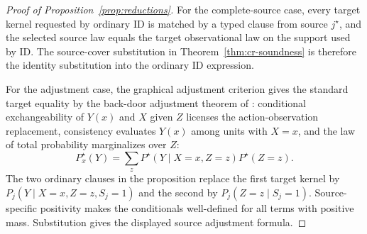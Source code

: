 \documentclass[11pt]{article}
\theoremstyle{definition}
\theoremstyle{plain}
\theoremstyle{remark}
\begin{document}
\begin{proof}[Proof of Proposition~\ref{prop:reductions}]
For the complete-source case, every target kernel requested by ordinary ID is
matched by a typed clause from source \(j^\star\), and the selected source law
equals the target observational law on the support used by ID.  The
source-cover substitution in Theorem~\ref{thm:cr-soundness} is
therefore the identity substitution into the ordinary ID expression.

For the adjustment case, the graphical adjustment criterion gives the
standard target equality by the back-door adjustment theorem of
\cite{Pearl1995CausalDiagrams}: conditional
exchangeability of \(Y(x)\) and \(X\) given \(Z\) licenses the
action-observation replacement, consistency evaluates \(Y(x)\) among units
with \(X=x\), and the law of total probability marginalizes over \(Z\):
\[
  P^\star_x(Y)=\sum_z P^\star(Y\mid X=x,Z=z)P^\star(Z=z).
\]
The two ordinary clauses in the proposition replace the first target kernel
by \(P_j(Y\mid X=x,Z=z,S_j=1)\) and the second by
\(P_j(Z=z\mid S_j=1)\).  Source-specific positivity makes the conditionals
well-defined for all terms with positive mass.  Substitution gives the
displayed source adjustment formula.
\end{proof}
\end{document}
